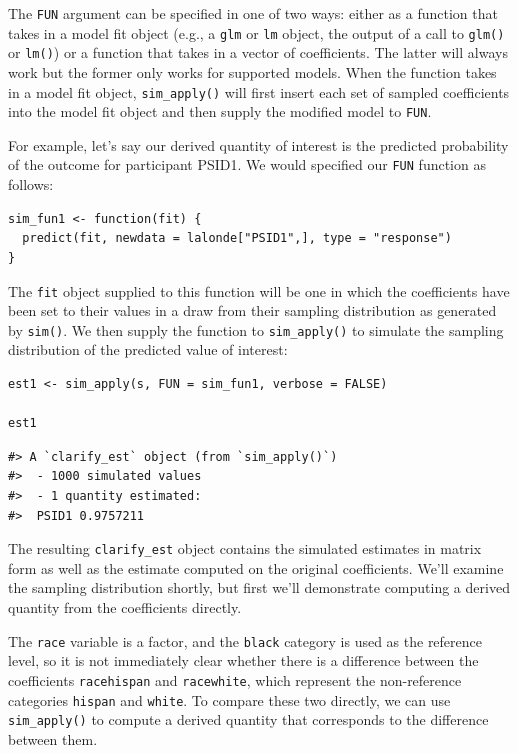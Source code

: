 The \texttt{FUN} argument can be specified in one of two ways: either as a function that takes in a model fit object (e.g., a \texttt{glm} or \texttt{lm} object, the output of a call to \texttt{glm()} or \texttt{lm()}) or a function that takes in a vector of coefficients. The latter will always work but the former only works for supported models. When the function takes in a model fit object, \texttt{sim\_apply()} will first insert each set of sampled coefficients into the model fit object and then supply the modified model to \texttt{FUN}.

For example, let's say our derived quantity of interest is the predicted probability of the outcome for participant PSID1. We would specified our \texttt{FUN} function as follows:

\begin{verbatim}
sim_fun1 <- function(fit) {
  predict(fit, newdata = lalonde["PSID1",], type = "response")
}
\end{verbatim}

The \texttt{fit} object supplied to this function will be one in which the coefficients have been set to their values in a draw from their sampling distribution as generated by \texttt{sim()}. We then supply the function to \texttt{sim\_apply()} to simulate the sampling distribution of the predicted value of interest:

\begin{verbatim}
est1 <- sim_apply(s, FUN = sim_fun1, verbose = FALSE)

est1
\end{verbatim}

\begin{verbatim}
#> A `clarify_est` object (from `sim_apply()`)
#>  - 1000 simulated values
#>  - 1 quantity estimated:                
#>  PSID1 0.9757211
\end{verbatim}

The resulting \texttt{clarify\_est} object contains the simulated estimates in matrix form as well as the estimate computed on the original coefficients. We'll examine the sampling distribution shortly, but first we'll demonstrate computing a derived quantity from the coefficients directly.

The \texttt{race} variable is a factor, and the \texttt{black} category is used as the reference level, so it is not immediately clear whether there is a difference between the coefficients \texttt{racehispan} and \texttt{racewhite}, which represent the non-reference categories \texttt{hispan} and \texttt{white}. To compare these two directly, we can use \texttt{sim\_apply()} to compute a derived quantity that corresponds to the difference between them.

